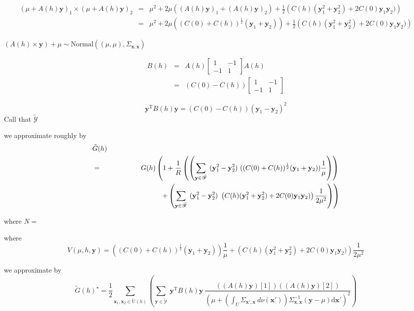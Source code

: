 \documentclass[12pt]{article}
\theoremstyle{definition}
\theoremstyle{remark}
\newcommand{\range}[1]{\mathscr{#1}}
\newcommand{\dominantU}{\nu}
\newcommand{\derive}{\mathrm{d}}
\newcommand{\Semivariogram}{G}
\newcommand{\Pop}{\mathrm{U}}
\newcommand{\position}{\mathbf{x}}
\newcommand{\Signal}{Y}
\newcommand{\signal}{\mathbf{y}}
\begin{document}
\begin{eqnarray*}
(\mu+A(h)\signal)_1\times (\mu+A(h)\signal)_2&=&
\mu^2+
2\mu((A(h)\signal)_1+(A(h)\signal)_2)+\frac12 \left(C(h)(\signal_1^2+\signal_2^2)+2C(0)\signal_1\signal_2)\right)\\&=&
\mu^2+
2\mu((C(0)+C(h))^{\frac12}(\signal_1+\signal_2))+\frac12 \left(C(h)(\signal_1^2+\signal_2^2)+2C(0)\signal_1\signal_2)\right)

\end{eqnarray*}



$(A(h)\times\signal)+\mu\sim\mathrm{Normal}((\mu,\mu),\Sigma_{\position,\position})$

\begin{eqnarray*}
    B(h)&=&A(h)\begin{bmatrix}1&-1\\-1&1\end{bmatrix}A(h)\\
        &=&(C(0)-C(h))\begin{bmatrix}1&-1\\-1&1\end{bmatrix}
\end{eqnarray*}


$$\signal^{\mathrm{T}} B(h)\signal=(C(0)-C(h))(\signal_1-\signal_2)^2$$
Call that $\tilde{\mathscr{Y}}$

we approximate roughly by 
\begin{eqnarray*}
\lefteqn{\tilde\Semivariogram(h)}\\&=&
\Semivariogram(h)\left(1+ \frac1{R} \left(\left(\sum_{\signal\in\tilde{\range{\Signal}}} ~(\signal_1^2-\signal_2^2)~ 
((C(0)+C(h))^{\frac12}(\signal_1+\signal_2))\frac1\mu
\right)\right)\right.\\&&\quad\quad\quad\quad\quad\quad\quad\quad\left.
+\left(\sum_{\signal\in\tilde{\range{\Signal}}} ~(\signal_1^2-\signal_2^2)~ \left(C(h)(\signal_1^2+\signal_2^2)+2C(0)\signal_1\signal_2)\right)\frac1{2\mu^2}
\right)\right)\end{eqnarray*}

where $N=$

where $$V(\mu,h,\signal)=
((C(0)+C(h))^{\frac12}(\signal_1+\signal_2))\frac1\mu+ \left(C(h)(\signal_1^2+\signal_2^2)+2C(0)\signal_1\signal_2)\right)\frac1{2\mu^2}
 $$

we approximate by 
$$\tilde\Semivariogram(h)^\star=\frac12\sum_{\position_1,\position_2\in\tilde{\Pop}(h)} \left(\sum_{\signal\in\tilde{\range{\Signal}}} ~\signal^{\mathrm{T}} B(h)\signal~ 
  \frac{
  ((A(h)\signal)[1])
  ((A(h)\signal)[2])
  }{\left(
           \mu+\left(\int_{U}\Sigma_{\position',\position}~d\dominantU\left(\position'\right)\right)\Sigma_{\position,\position}^{-1}(\signal-\mu)\derive\position'\right)^{2} }
\right) $$
\end{document}
